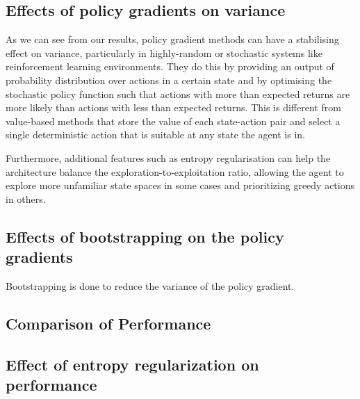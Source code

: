 \documentclass{article}
\begin{document}
\subsection{Effects of policy gradients on variance}
As we can see from our results, policy gradient methods can have a stabilising effect on variance, particularly in highly-random or stochastic systems like reinforcement learning environments. They do this by providing an output of  probability distribution over actions in a certain state and by optimising the stochastic policy function such that actions with more than expected returns are more likely than actions with less than expected returns. This is different from value-based methods that store the value of each state-action pair and select a single deterministic action that is suitable at any state the agent is in.  
\par Furthermore, additional features such as entropy regularisation can help the architecture balance the exploration-to-exploitation ratio, allowing the agent to explore more unfamiliar state spaces in some cases and prioritizing greedy actions in others. 
\subsection{Effects of bootstrapping on the policy gradients}
Bootstrapping is done to reduce the variance of the policy gradient. 
\subsection{Comparison of Performance}
\subsection{Effect of entropy regularization on performance}



\end{document}

